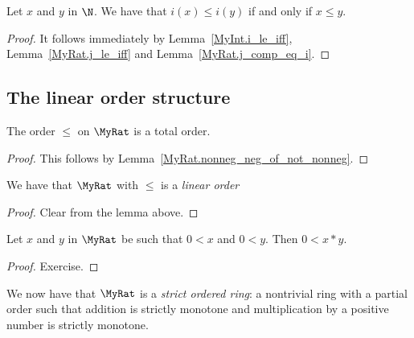 \begin{lemma}
    \label{MyRat.i_le_iff}
    \leanok
    Let $x$ and $y$ in $\N$. We have that $i(x) \leq i(y)$ if and only if $x \leq y$.
\end{lemma}
\begin{proof}
    \leanok
    It follows immediately by Lemma~\ref{MyInt.i_le_iff}, Lemma~\ref{MyRat.j_le_iff} and Lemma~\ref{MyRat.j_comp_eq_i}.
\end{proof}

\subsection{The linear order structure}

\begin{lemma}
    \label{MyRat.le_total}
    \leanok
    The order $\leq$ on $\MyRat$ is a total order.
\end{lemma}
\begin{proof}
    \leanok
This follows by Lemma~\ref{MyRat.nonneg_neg_of_not_nonneg}.
\end{proof}

\begin{lemma}
    \label{MyRat.linearOrder}
    \leanok
    We have that $\MyRat$ with $\leq$ is a \emph{linear order}
\end{lemma}
\begin{proof}
    \leanok
    Clear from the lemma above.
\end{proof}

\begin{lemma}
    \label{MyRat.mul_pos}
    \leanok
    Let $x$ and $y$ in $\MyRat$ be such that $0 < x$ and $0 < y$. Then $0 < x * y$.
\end{lemma}
\begin{proof}
    \leanok
Exercise.
\end{proof}

We now have that $\MyRat$ is a \emph{strict ordered ring}: a nontrivial ring with a partial order such that addition is strictly monotone and multiplication by a positive number is strictly monotone.